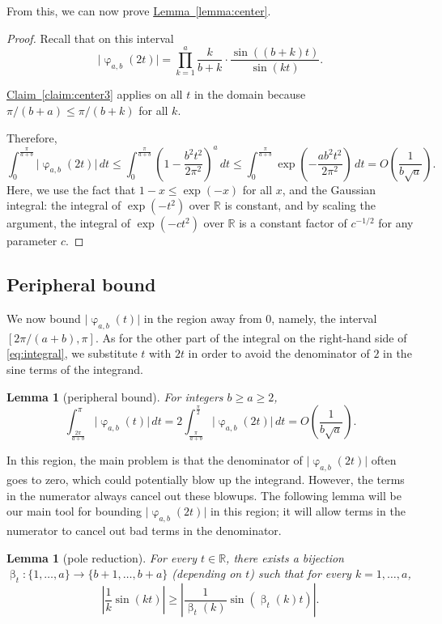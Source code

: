 \documentclass[11pt]{article}
\numberwithin{equation}{section}
\newtheorem{lemma}[theorem]{Lemma}
\theoremstyle{definition}
\theoremstyle{plain}
\newcommand{\expref}[2]{\hyperref[#2]{#1~\ref{#2}}}
\DeclareMathOperator{\charfn}{\varphi}
\DeclareMathOperator{\bij}{\beta}
\begin{document}
From this, we can now prove \expref{Lemma}{lemma:center}.

\begin{proof}
    Recall that on this interval
    \[\lvert\charfn_{a,b}(2t)\rvert=\prod_{k=1}^{a} \frac{k}{b+k}\cdot\frac{\sin((b+k)t)}{\sin(kt)}.\]
    
\expref{Claim}{claim:center3} applies on all $t$ in the domain because $\pi/(b+a)\le \pi/(b+k)$ for all $k$.
    
    Therefore,
    \[\int_0^{\frac{\pi}{a+b}} \lvert\charfn_{a,b}(2t)\rvert\,dt \le \int_0^{\frac{\pi}{a+b}} \left(1-\frac{b^2t^2}{2\pi^2}\right)^a\,dt \le \int_0^{\frac{\pi}{a+b}} \exp\left(-\frac{ab^2t^2}{2\pi^2}\right)\,dt =O\left(\frac{1}{b\sqrt{a}}\right). \]
    Here, we use the fact that $1-x\le \exp(-x)$ for all $x$, and the Gaussian integral: the integral of $\exp(-t^2)$ over $\mathbb{R}$ is constant, and by scaling the argument, the integral of $\exp(-ct^2)$ over $\mathbb{R}$ is a constant factor of $c^{-1/2}$ for any parameter $c$. 
\end{proof}

\subsection{Peripheral bound}
\label{sec:peripheral}

We now bound $\lvert\charfn_{a,b}(t)\rvert$ in the region away from $0$, namely, the interval $[2\pi/(a+b),\pi]$. As for the other part of the integral on the right-hand side of \eqref{eq:integral}, we substitute $t$ with $2t$ in order to avoid the denominator of $2$ in the sine terms of the integrand. 

\begin{lemma}[peripheral bound]
    \label{lemma:far}
    For integers $b\ge a\ge 2$,
    \[ \int_{\frac{2\pi}{a+b}}^\pi \lvert\charfn_{a,b}(t)\rvert\, dt =  2 \int_{\frac{\pi}{a+b}}^{\frac{\pi}{2}} \lvert\charfn_{a,b}(2t)\rvert\, dt = O\left(\frac{1}{b\sqrt{a}}\right). \]    
\end{lemma}

In this region, the main problem is that the denominator of $\lvert\charfn_{a,b}(2t)\rvert$ often goes to zero, which could potentially blow up the integrand. However, the terms in the numerator always cancel out these blowups. The following lemma will be our main tool for bounding $\lvert\charfn_{a,b}(2t)\rvert$ in this region; it will allow terms in the numerator to cancel out bad terms in the denominator.

\begin{lemma}[pole reduction]
    \label{lemma:bijection}
    For every $t\in\mathbb{R}$, there exists a bijection $\bij_t:\{1,\dots,a\}\to\{b+1,\dots,b+a\}$ (depending on $t$) such that for every $k=1,\dots,a$,
    \[\left|\frac{1}{k}\sin(kt)\right| \ge \left|\frac{1}{\bij_t(k)}\sin(\bij_t(k)t)\right|. \]
\end{lemma}
\end{document}
